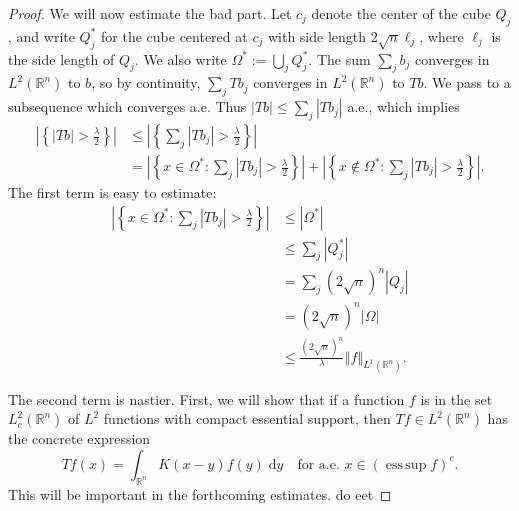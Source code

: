 \documentclass{book}
\newcommand{\bbR}{\mathbb{R}}
\renewcommand{\d}{\mathrm{d}}
\newcommand{\abs}[1]{\left\lvert {#1} \right\rvert}
\newcommand{\norm}[1]{\left\Vert {#1} \right\Vert}
\newcommand{\set}[1]{\left\{ {#1} \right\}}
\DeclareMathOperator{\esssup}{ess\,sup}
\theoremstyle{definition}
\theoremstyle{remark}
\numberwithin{equation}{chapter}
\begin{document}
\begin{proof}
    We will now estimate the bad part. Let $c_j$ denote the center of the cube $Q_j$, and write $Q_j^*$ for the cube centered at $c_j$ with side length $2\sqrt{n} \ell_j$, where $\ell_j$ is the side length of $Q_j$. We also write $\Omega^* := \bigcup_j Q_j^*$. The sum $\sum_j b_j$ converges in $L^2(\bbR^n)$ to $b$, so by continuity, $\sum_j Tb_j$ converges in $L^2(\bbR^n)$ to $Tb$. We pass to a subsequence which converges a.e. Thus $\abs{Tb} \leq \sum_j \abs{Tb_j}$ a.e., which implies 
    \begin{equation} \begin{aligned}
        \abs{\set{ \abs{Tb} > \frac{\lambda}{2} }}
        &\leq \abs{\set{ \sum_j \abs{Tb_j} > \frac{\lambda}{2} }} \\
        &= \abs{\set{ x \in \Omega^* : \sum_j \abs{Tb_j} > \frac{\lambda}{2} }} 
        + \abs{\set{ x \notin \Omega^* : \sum_j \abs{Tb_j} > \frac{\lambda}{2} }}.
    \end{aligned} \end{equation}
    The first term is easy to estimate:
    \begin{equation} \begin{aligned}
        \abs{\set{ x \in \Omega^* : \sum_j \abs{Tb_j} > \frac{\lambda}{2} }}
        &\leq \abs{\Omega^*} \\
        &\leq \sum_j \abs{Q_j^*} \\
        &= \sum_j (2\sqrt{n})^n \abs{Q_j} \\
        &= (2\sqrt{n})^n \abs{\Omega} \\
        &\leq \frac{(2\sqrt{n})^n}{\lambda} \norm{f}_{L^1(\bbR^n)}.
    \end{aligned} \end{equation}

    The second term is nastier. First, we will show that if a function $f$ is in the set $L^2_c(\bbR^n)$ of $L^2$ functions with compact essential support, then $Tf \in L^2(\bbR^n)$ has the concrete expression 
    \begin{equation}
        Tf(x) = \int_{\bbR^n} K(x-y) f(y) \; \d y \quad \text{for a.e. } x \in (\esssup{f})^c.
    \end{equation}
    This will be important in the forthcoming estimates. {\color{red} do eet}
    

\end{proof}
\end{document}
